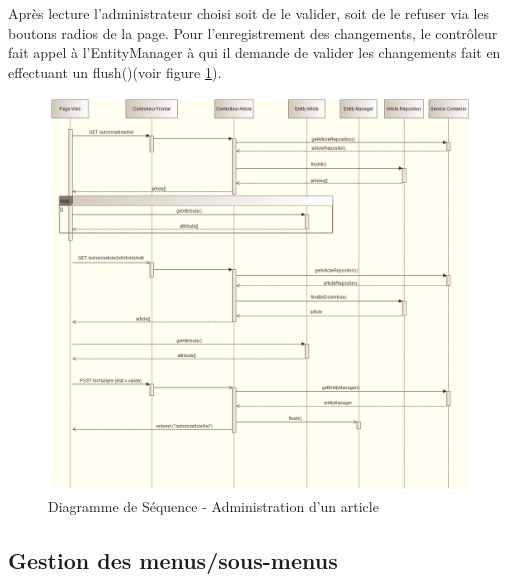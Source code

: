 \documentclass[a4paper,12pt, notitlepage]{report}
\begin{document}
Après lecture l’administrateur choisi soit de le valider, soit de le refuser via les boutons radios de la page.
Pour l’enregistrement des changements, le contrôleur fait appel à l’EntityManager à qui il demande de valider les changements fait en effectuant un flush()(voir figure \ref{admin-article}).

\begin{figure} 
    \caption{Diagramme de Séquence - Administration d'un article}  
    \label{admin-article}
    \centering
    \includegraphics[scale=0.38]{images/DiagSequenceAdministrationArticle.png}
\end{figure}

\subsection{Gestion des menus/sous-menus}
\end{document}
